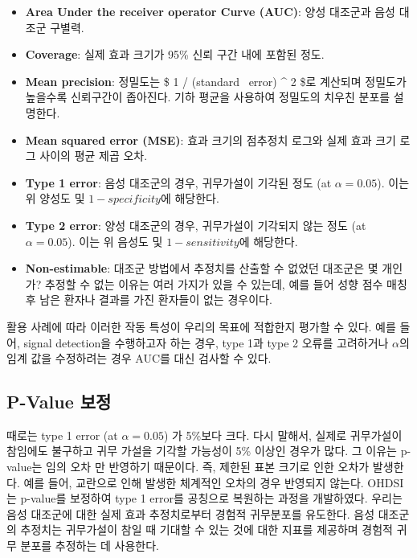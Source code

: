 \documentclass[11pt]{book}
\providecommand{\tightlist}{%
  \setlength{\itemsep}{0pt}\setlength{\parskip}{0pt}}
\theoremstyle{definition}
\theoremstyle{definition}
\theoremstyle{definition}
\theoremstyle{remark}
\begin{document}
\begin{itemize}
\tightlist
\item
  \textbf{Area Under the receiver operator Curve (AUC)}: 양성 대조군과
  음성 대조군 구별력.
\item
  \textbf{Coverage}: 실제 효과 크기가 95\% 신뢰 구간 내에 포함된 정도.
\item
  \textbf{Mean precision}: 정밀도는 \$ 1 / (standard ~error) \^{} 2 \$로
  계산되며 정밀도가 높을수록 신뢰구간이 좁아진다. 기하 평균을 사용하여
  정밀도의 치우친 분포를 설명한다.
\item
  \textbf{Mean squared error (MSE)}: 효과 크기의 점추정치 로그와 실제
  효과 크기 로그 사이의 평균 제곱 오차.
\item
  \textbf{Type 1 error}: 음성 대조군의 경우, 귀무가설이 기각된 정도 (at
  \(\alpha = 0.05\)). 이는 위 양성도 및 \(1 - specificity\)에 해당한다.
\item
  \textbf{Type 2 error}: 양성 대조군의 경우, 귀무가설이 기각되지 않는
  정도 (at \(\alpha = 0.05\)). 이는 위 음성도 및 \(1 - sensitivity\)에
  해당한다.
\item
  \textbf{Non-estimable}: 대조군 방법에서 추정치를 산출할 수 없었던
  대조군은 몇 개인가? 추정할 수 없는 이유는 여러 가지가 있을 수 있는데,
  예를 들어 성향 점수 매칭 후 남은 환자나 결과를 가진 환자들이 없는
  경우이다.
\end{itemize}

활용 사례에 따라 이러한 작동 특성이 우리의 목표에 적합한지 평가할 수
있다. 예를 들어, signal detection을 수행하고자 하는 경우, type 1과 type
2 오류를 고려하거나 \(\alpha\)의 임계 값을 수정하려는 경우 AUC를 대신
검사할 수 있다.

\subsection{P-Value 보정}\label{p-value-}

 

때로는 type 1 error (at \(\alpha = 0.05\)) 가 5\%보다 크다. 다시 말해서,
실제로 귀무가설이 참임에도 불구하고 귀무 가설을 기각할 가능성이 5\%
이상인 경우가 많다. 그 이유는 p-value는 임의 오차 만 반영하기 때문이다.
즉, 제한된 표본 크기로 인한 오차가 발생한다. 예를 들어, 교란으로 인해
발생한 체계적인 오차의 경우 반영되지 않는다. OHDSI는 p-value를 보정하여
type 1 error를 공칭으로 복원하는 과정을 개발하였다.
\citep{schuemie_2014} 우리는 음성 대조군에 대한 실제 효과 추정치로부터
경험적 귀무분포를 유도한다. 음성 대조군의 추정치는 귀무가설이 참일 때
기대할 수 있는 것에 대한 지표를 제공하며 경험적 귀무 분포를 추정하는 데
사용한다.
\end{document}
